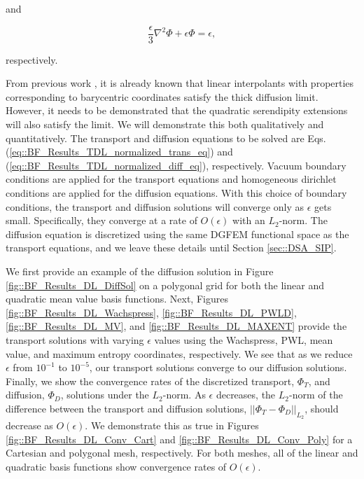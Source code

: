 \noindent and

\begin{equation}
\label{eq::BF_Results_TDL_normalized_diff_eq}
\frac{\epsilon}{3} {\nabla}^2 \Phi + \epsilon  \Phi =  \epsilon ,
\end{equation}

\noindent respectively.

From previous work \cite{adams2001dfem}, it is already known that linear interpolants with properties corresponding to barycentric coordinates satisfy the thick diffusion limit. However, it needs to be demonstrated that the quadratic serendipity extensions will also satisfy the limit. We will demonstrate this both qualitatively and quantitatively. The transport and diffusion equations to be solved are Eqs. (\ref{eq::BF_Results_TDL_normalized_trans_eq}) and (\ref{eq::BF_Results_TDL_normalized_diff_eq}), respectively. Vacuum boundary conditions are applied for the transport equations and homogeneous dirichlet conditions are applied for the diffusion equations. With this choice of boundary conditions, the transport and diffusion solutions will converge only as $\epsilon$ gets small. Specifically, they converge at a rate of $O(\epsilon)$ with an $L_2$-norm. The diffusion equation is discretized using the same DGFEM functional space as the transport equations, and we leave these details until Section \ref{sec::DSA_SIP}. 

We first provide an example of the diffusion solution in Figure \ref{fig::BF_Results_DL_DiffSol} on a polygonal grid for both the linear and quadratic mean value basis functions. Next, Figures \ref{fig::BF_Results_DL_Wachspress}, \ref{fig::BF_Results_DL_PWLD}, \ref{fig::BF_Results_DL_MV}, and \ref{fig::BF_Results_DL_MAXENT} provide the transport solutions with varying $\epsilon$ values using the Wachspress, PWL, mean value, and maximum entropy coordinates, respectively. We see that as we reduce $\epsilon$ from $10^{-1}$ to $10^{-5}$, our transport solutions converge to our diffusion solutions. Finally, we show the convergence rates of the discretized transport, $\Phi_T$, and diffusion, $\Phi_D$, solutions under the $L_2$-norm. As $\epsilon$ decreases, the $L_2$-norm of the difference between the transport and diffusion solutions, $|| \Phi_T - \Phi_D||_{L_2}$, should decrease as $O(\epsilon)$. We demonstrate this as true in Figures \ref{fig::BF_Results_DL_Conv_Cart} and \ref{fig::BF_Results_DL_Conv_Poly} for a Cartesian and polygonal mesh, respectively. For both meshes, all of the linear and quadratic basis functions show convergence rates of $O(\epsilon)$.

